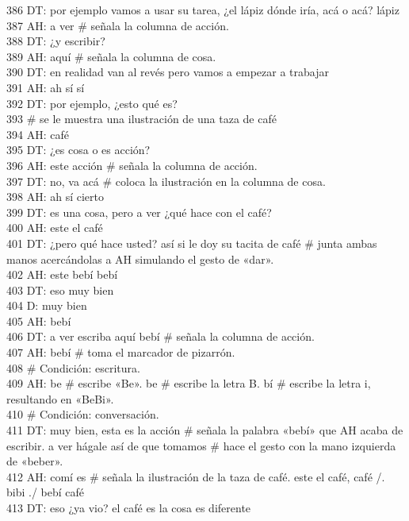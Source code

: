 386 DT: por ejemplo vamos a usar su tarea, ¿el lápiz dónde iría, acá o acá? lápiz\\
387 AH: a ver \# señala la columna de acción.\\
388 DT: ¿y escribir?\\
389 AH: aquí \# señala la columna de cosa.\\
390 DT: en realidad van al revés pero vamos a empezar a trabajar\\
391 AH: ah sí sí\\
392 DT: por ejemplo, ¿esto qué es?\\
393 \# se le muestra una ilustración de una taza de café\\
394 AH: café\\
395 DT: ¿es cosa o es acción?\\
396 AH: este acción \# señala la columna de acción.\\
397 DT: no, va acá \# coloca la ilustración en la columna de cosa.\\
398 AH: ah sí cierto\\
399 DT: es una cosa, pero a ver ¿qué hace con el café?\\
400 AH: este el café\\
401 DT: ¿pero qué hace usted? así si le doy su tacita de café \# junta ambas manos acercándolas a AH simulando el gesto de «dar».\\
402 AH: este bebí bebí\\
403 DT: eso muy bien\\
404 D: muy bien\\
405 AH: bebí\\
406 DT: a ver escriba aquí bebí \# señala la columna de acción.\\
407 AH: bebí \# toma el marcador de pizarrón.\\
408 \# Condición: escritura.\\
409 AH: be \# escribe «Be». be \# escribe la letra B. bí \# escribe la letra i, resultando en «BeBi».\\
410 \# Condición: conversación.\\
411 DT: muy bien, esta es la acción \# señala la palabra «bebí» que AH acaba de escribir. a ver hágale así de que tomamos \# hace el gesto con la mano izquierda de «beber».\\
412 AH: comí es \# señala la ilustración de la taza de café. este el café, café /. bibi ./ bebí café\\
413 DT: eso ¿ya vio? el café es la cosa es diferente\\
